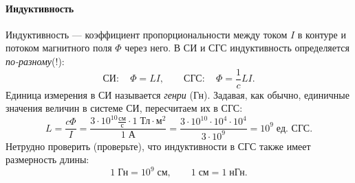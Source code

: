 \paragraph{Индуктивность}

Индуктивность --- коэффициент пропорциональности между током $I$
в контуре и потоком магнитного поля $\Phi$ через него. В СИ и СГС
индуктивность определяется \emph{по-разному}(!):
\[
\text{СИ}:\quad\Phi=LI,\qquad\text{СГС}:\quad\Phi=\frac{1}{c}LI.
\]
Единица измерения в СИ называется \emph{генри} (Гн). Задавая, как
обычно, единичные значения величин в системе СИ, пересчитаем их в
СГС:
\[
L=\frac{c\Phi}{I}=
\frac{3\cdot10^{10}\frac{\text{см}}{\text{с}}\cdot1\;\text{Тл}\cdot\text{м}^{2}}{1\;\text{А}}=
\frac{3\cdot10^{10}\cdot10^{4}\cdot10^{4}}{3\cdot10^{9}}=10^{9}\;\text{ед. СГС}.
\]
Нетрудно проверить (проверьте), что индуктивности в СГС также имеет
размерность длины:
\[
1\;\text{Гн}=10^{9}\;\text{см},\qquad1\;\text{см}=1\;\text{нГн}.
\]


\newpage

